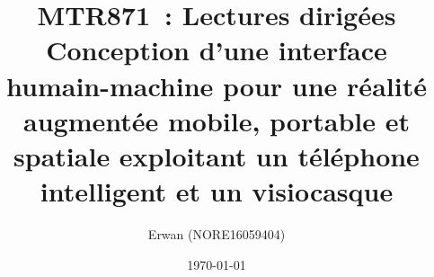 \documentclass[letterpaper,twoside,12pt]{article}
\title{
	MTR871~: Lectures dirigées \\
	\large Conception d'une interface humain-machine pour une réalité augmentée mobile, portable et spatiale exploitant un téléphone intelligent et un visiocasque}
\author{Erwan \bsc{Normand} (NORE16059404)}
\date{\today}
\begin{document}
	
	\maketitle
	
	

	\newpage
	\begin{spacing}{1}
		
		
	\end{spacing}
\end{document}
